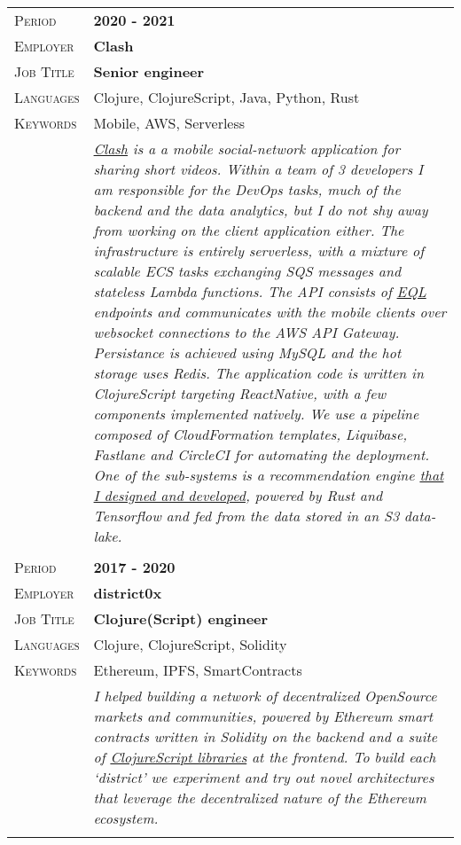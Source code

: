 \documentclass[a4paper, oneside, final]{scrartcl}
\newcommand{\gray}{\rowcolor[gray]{.90}}
\begin{document}
\begin{center}
\begin{tabularx}{0.97\linewidth}{>{\raggedleft\scshape}p{2cm}X}
\gray Period    & \textbf{2020 - 2021}\\
\gray Employer  & \textbf{Clash} \\
\gray Job Title & \textbf{Senior engineer}\\
\gray Languages & Clojure, ClojureScript, Java, Python, Rust\\
\gray Keywords & Mobile, AWS, Serverless \\
\gray           &  {\textit{
    \href{https://clashapp.co/}{Clash} is a a mobile social-network application for sharing short videos.
    Within a team of 3 developers I am responsible for the DevOps tasks, much of the backend and the data analytics, but I do not shy away from working on the client application either.
    The infrastructure is entirely serverless, with a mixture of scalable ECS tasks exchanging SQS messages and stateless Lambda functions.
    The API consists of \href{https://eql.readthedocs.io/en/latest/}{EQL} endpoints and communicates with the mobile clients over websocket connections to the AWS API Gateway.
    Persistance is achieved using MySQL and the hot storage uses Redis.
    The application code is written in ClojureScript targeting ReactNative, with a few components implemented natively.
    We use a pipeline composed of CloudFormation templates, Liquibase, Fastlane and CircleCI for automating the deployment.
    One of the sub-systems is a recommendation engine \href{https://www.youtube.com/watch?v=RG4g0Wd_elo&t=1s}{that I designed and developed}, powered by Rust and Tensorflow and fed from the data stored in an S3 data-lake.
}}\\ \\

\gray Period    & \textbf{2017 - 2020}\\
\gray Employer  & \textbf{district0x} \\
\gray Job Title & \textbf{Clojure(Script) engineer}\\
\gray Languages & Clojure, ClojureScript, Solidity\\
\gray Keywords & Ethereum, IPFS, SmartContracts \\
\gray           &  {\textit{
    I helped building a network of decentralized OpenSource markets and communities, powered by Ethereum smart contracts written in Solidity on the backend and a suite of \href{https://github.com/district0x}{ClojureScript libraries} at the frontend.
    To build each `district' we experiment and try out novel architectures that leverage the decentralized nature of the Ethereum ecosystem.
}}\\ \\


\end{tabularx}
\end{center}
\end{document}
